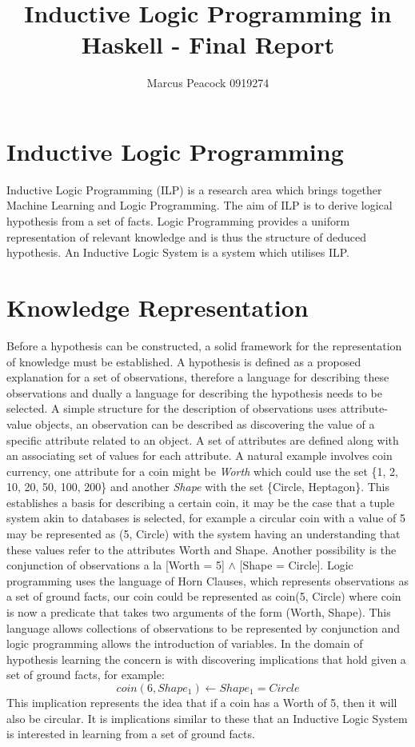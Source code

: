 \documentclass{article}
\title{Inductive Logic Programming in Haskell - Final Report}
\author{Marcus Peacock 0919274}
\begin{document}
\maketitle

\section{Inductive Logic Programming}

Inductive Logic Programming (ILP) is a research area which brings together
Machine Learning and Logic Programming. The aim of ILP is to derive logical
hypothesis from a set of facts. Logic Programming provides a uniform
representation of relevant knowledge and is thus the structure of deduced
hypothesis. An Inductive Logic System is a system which utilises ILP.

\section{Knowledge Representation}

Before a hypothesis can be constructed, a solid framework for the
representation of knowledge must be established. A hypothesis is defined as a
proposed explanation for a set of observations, therefore a language for
describing these observations and dually a language for describing the
hypothesis needs to be selected.
A simple structure for the description of observations uses attribute-value
objects, an observation can be described as discovering the value of a specific
attribute related to an object. A set of attributes are defined along with an
associating set of values for each attribute. A natural example involves coin
currency, one attribute for a coin might be {\it Worth} which could use the
set \{1, 2, 10, 20, 50, 100, 200\} and another {\it Shape} with the set \{Circle,
Heptagon\}. This establishes a basis for describing a certain coin, it may
be the case that a tuple system akin to databases is selected, for example
a circular coin with a value of 5 may be represented as (5, Circle) with
the system having an understanding that these values refer to the
attributes Worth and Shape. Another possibility is the conjunction of
observations a la [Worth = 5] $\wedge$ [Shape = Circle]. Logic programming
uses the language of Horn Clauses, which represents observations as a set
of ground facts, our coin could be represented as coin(5, Circle) where
coin is now a predicate that takes two arguments of the form (Worth,
Shape). This language allows collections of observations to be
represented by conjunction and logic programming allows the introduction of
variables. In the domain of hypothesis learning the concern is with
discovering implications that hold given a set of ground facts, for
example:
$$  coin(6, Shape_1) \leftarrow Shape_1 = Circle $$
This implication represents the idea that if a coin has a Worth of 5, then it
will also be circular. It is implications similar to these that an Inductive
Logic System is interested in learning from a set of ground facts.
\end{document}
